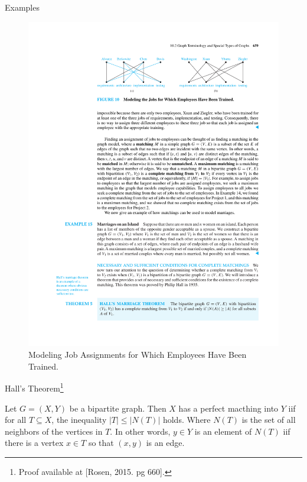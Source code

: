 \documentclass{beamer}
\theoremstyle{definition}
\begin{document}
\begin{frame}{Examples}
    \begin{figure}
        \includegraphics[trim={5.9cm 21.5cm 2.5cm 3cm}, clip, width=1\linewidth]{p659}
        \caption{Modeling Job Assignments for Which Employees Have Been Trained.}
    \end{figure}
\end{frame}

\begin{frame}{Hall's Theorem\footnote{Proof available at [Rosen, 2015. pg 660].}}
    \begin{theorem}
        Let $G = (X,Y)$ be a bipartite graph. Then $X$ has a perfect macthing into $Y$ iif for all $T \subseteq X$, the inequality $|T| \leq |N(T)|$ holds. Where $N(T)$ is the set of all neighbors of the vertices in $T$. In other words, $y \in  Y$ is an element of $N(T)$ iif there is a vertex $x \in  T$ so that $(x,y)$ is an edge.
    \end{theorem}
\end{frame}
\end{document}
